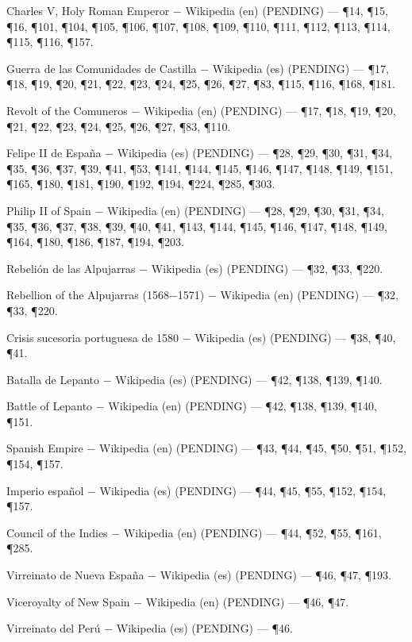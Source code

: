 \documentclass{book}
\begin{document}
\noindent Charles V, Holy Roman Emperor \(-\) Wikipedia (en) (PENDING) --- \P14, \P15, \P16, \P101, \P104, \P105, \P106, \P107, \P108, \P109, \P110, \P111, \P112, \P113, \P114, \P115, \P116, \P157.

\noindent Guerra de las Comunidades de Castilla \(-\) Wikipedia (es) (PENDING) --- \P17, \P18, \P19, \P20, \P21, \P22, \P23, \P24, \P25, \P26, \P27, \P83, \P115, \P116, \P168, \P181.

\noindent Revolt of the Comuneros \(-\) Wikipedia (en) (PENDING) --- \P17, \P18, \P19, \P20, \P21, \P22, \P23, \P24, \P25, \P26, \P27, \P83, \P110.

\noindent Felipe II de España \(-\) Wikipedia (es) (PENDING) --- \P28, \P29, \P30, \P31, \P34, \P35, \P36, \P37, \P39, \P41, \P53, \P141, \P144, \P145, \P146, \P147, \P148, \P149, \P151, \P165, \P180, \P181, \P190, \P192, \P194, \P224, \P285, \P303.

\noindent Philip II of Spain \(-\) Wikipedia (en) (PENDING) --- \P28, \P29, \P30, \P31, \P34, \P35, \P36, \P37, \P38, \P39, \P40, \P41, \P143, \P144, \P145, \P146, \P147, \P148, \P149, \P164, \P180, \P186, \P187, \P194, \P203.

\noindent Rebelión de las Alpujarras \(-\) Wikipedia (es) (PENDING) --- \P32, \P33, \P220.

\noindent Rebellion of the Alpujarras (1568\(-\)1571) \(-\) Wikipedia (en) (PENDING) --- \P32, \P33, \P220.

\noindent Crisis sucesoria portuguesa de 1580 \(-\) Wikipedia (es) (PENDING) --- \P38, \P40, \P41.

\noindent Batalla de Lepanto \(-\) Wikipedia (es) (PENDING) --- \P42, \P138, \P139, \P140.

\noindent Battle of Lepanto \(-\) Wikipedia (en) (PENDING) --- \P42, \P138, \P139, \P140, \P151.

\noindent Spanish Empire \(-\) Wikipedia (en) (PENDING) --- \P43, \P44, \P45, \P50, \P51, \P152, \P154, \P157.

\noindent Imperio español \(-\) Wikipedia (es) (PENDING) --- \P44, \P45, \P55, \P152, \P154, \P157.

\noindent Council of the Indies \(-\) Wikipedia (en) (PENDING) --- \P44, \P52, \P55, \P161, \P285.

\noindent Virreinato de Nueva España \(-\) Wikipedia (es) (PENDING) --- \P46, \P47, \P193.

\noindent Viceroyalty of New Spain \(-\) Wikipedia (en) (PENDING) --- \P46, \P47.

\noindent Virreinato del Perú \(-\) Wikipedia (es) (PENDING) --- \P46.
\end{document}
